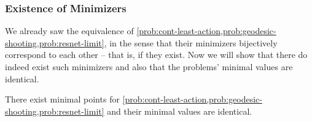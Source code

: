 \subsubsection{Existence of Minimizers}

We already saw the equivalence of \cref{prob:cont-least-action,prob:geodesic-shooting,prob:resnet-limit}, in the sense that their minimizers bijectively correspond to each other -- that is, if they exist.
Now we will show that there do indeed exist such minimizers and also that the problems' minimal values are identical.
\begin{theorem}
	\label{theo:continuous-solutions-existence}
		There exist minimal points for \cref{prob:cont-least-action,prob:geodesic-shooting,prob:resnet-limit} and their minimal values are identical.
\end{theorem}

